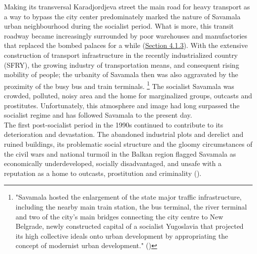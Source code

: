 \documentclass[11pt]{report}
\begin{document}
Making its transversal Karadjordjeva street the main road for heavy transport as a way to bypass the city center predominately marked the nature of Savamala urban neighbourhood during the socialist period.
What is more, this transit roadway became increasingly surrounded by poor warehouses and manufactories that replaced the bombed palaces for a while (\href{Section 4.1.3}{Section 4.1.3}). 
With the extensive construction of transport infrastructure in the recently industrialized country (SFRY), the growing  industry of transportation means, and consequent rising mobility of people; the urbanity of Savamala then was also aggravated by the proximity of the busy bus and train terminals.
\footnote{"Savamala hosted the enlargement of the state major traffic infrastructure, including the nearby main train station, the bus terminal, the river terminal and two of the city’s main bridges connecting the city centre to New Belgrade, newly constructed capital of a socialist Yugoslavia that projected its high collective ideals onto urban development by appropriating the concept of modernist urban development." (\citealt{cvetinovic_engine_2013})}
The socialist Savamala was crowded, polluted, noisy area and the home for marginalized groups, outcasts and prostitutes.
Unfortunately, this atmosphere and image had long surpassed the socialist regime and has followed Savamala to the present day.
\\

The first post-socialist period in the 1990s continued to contribute to its deterioration and devastation. The abandoned industrial plots and derelict and ruined buildings, its problematic social structure and the gloomy circumstances of the  civil wars and national turmoil in the Balkan region flagged Savamala as economically underdeveloped, socially disadvantaged, and unsafe with a reputation as a home to outcasts, prostitution and criminality (\citealt{cvetinovic_engine_2013}).
\\
\end{document}

